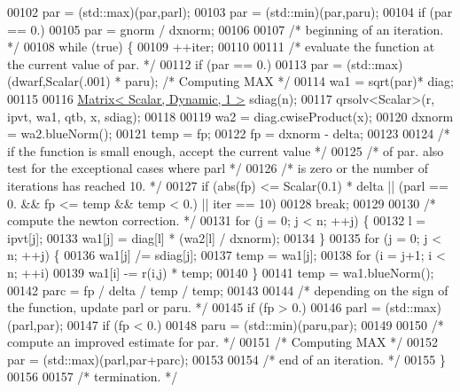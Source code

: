 \begin{DoxyCode}
00102     par = (std::max)(par,parl);
00103     par = (std::min)(par,paru);
00104     \textcolor{keywordflow}{if} (par == 0.)
00105         par = gnorm / dxnorm;
00106 
00107     \textcolor{comment}{/* beginning of an iteration. */}
00108     \textcolor{keywordflow}{while} (\textcolor{keyword}{true}) \{
00109         ++iter;
00110 
00111         \textcolor{comment}{/* evaluate the function at the current value of par. */}
00112         \textcolor{keywordflow}{if} (par == 0.)
00113             par = (std::max)(dwarf,Scalar(.001) * paru); \textcolor{comment}{/* Computing MAX */}
00114         wa1 = sqrt(par)* diag;
00115 
00116         \hyperlink{group___core___module}{Matrix< Scalar, Dynamic, 1 >} sdiag(n);
00117         qrsolv<Scalar>(r, ipvt, wa1, qtb, x, sdiag);
00118 
00119         wa2 = diag.cwiseProduct(x);
00120         dxnorm = wa2.blueNorm();
00121         temp = fp;
00122         fp = dxnorm - delta;
00123 
00124         \textcolor{comment}{/* if the function is small enough, accept the current value */}
00125         \textcolor{comment}{/* of par. also test for the exceptional cases where parl */}
00126         \textcolor{comment}{/* is zero or the number of iterations has reached 10. */}
00127         \textcolor{keywordflow}{if} (abs(fp) <= Scalar(0.1) * delta || (parl == 0. && fp <= temp && temp < 0.) || iter == 10)
00128             \textcolor{keywordflow}{break};
00129 
00130         \textcolor{comment}{/* compute the newton correction. */}
00131         \textcolor{keywordflow}{for} (j = 0; j < n; ++j) \{
00132             l = ipvt[j];
00133             wa1[j] = diag[l] * (wa2[l] / dxnorm);
00134         \}
00135         \textcolor{keywordflow}{for} (j = 0; j < n; ++j) \{
00136             wa1[j] /= sdiag[j];
00137             temp = wa1[j];
00138             \textcolor{keywordflow}{for} (i = j+1; i < n; ++i)
00139                 wa1[i] -= r(i,j) * temp;
00140         \}
00141         temp = wa1.blueNorm();
00142         parc = fp / delta / temp / temp;
00143 
00144         \textcolor{comment}{/* depending on the sign of the function, update parl or paru. */}
00145         \textcolor{keywordflow}{if} (fp > 0.)
00146             parl = (std::max)(parl,par);
00147         \textcolor{keywordflow}{if} (fp < 0.)
00148             paru = (std::min)(paru,par);
00149 
00150         \textcolor{comment}{/* compute an improved estimate for par. */}
00151         \textcolor{comment}{/* Computing MAX */}
00152         par = (std::max)(parl,par+parc);
00153 
00154         \textcolor{comment}{/* end of an iteration. */}
00155     \}
00156 
00157     \textcolor{comment}{/* termination. */}

\end{DoxyCode}
